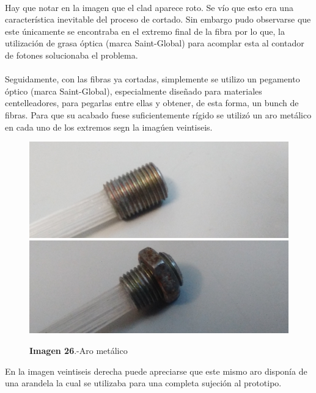 \documentclass[11pt, a4paper]{article}
\begin{document}
\paragraph {}
Hay que notar en la imagen que el clad aparece roto. Se vío que esto era una característica inevitable del proceso de cortado. Sin embargo pudo observarse que este únicamente se encontraba en el extremo final de la fibra por lo que, la utilización de grasa óptica (marca Saint-Global) para acomplar esta al contador de fotones solucionaba el problema.

\paragraph {}
Seguidamente, con las fibras ya cortadas, simplemente se utilizo un pegamento óptico (marca Saint-Global), especialmente diseñado para materiales centelleadores, para pegarlas entre ellas y obtener, de esta forma, un bunch de fibras. Para que su acabado fuese suficientemente rígido se utilizó un aro metálico en cada uno de los extremos segn la imagúen veintiseis.

\begin{figure}[htb]
\centering
{
\includegraphics[scale=0.2]{arometalico.png} 
}
{
\includegraphics[scale=0.2]{arometalicoconrosca.png} 
}
\caption{\textbf{Imagen 26}.-Aro metálico}
\end{figure} 

En la imagen veintiseis derecha puede apreciarse que este mismo aro disponía de una arandela la cual se utilizaba para una completa sujeción al prototipo.
\end{document}
